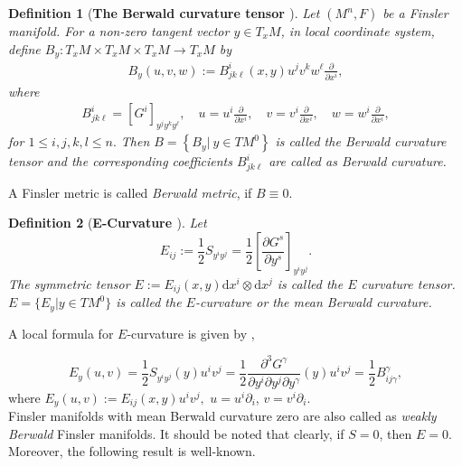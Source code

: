 \documentclass[pdflatex,sn-mathphys-num]{sn-jnl}%
\theoremstyle{thmstyleone}%
\theoremstyle{thmstyletwo}%
\theoremstyle{thmstylethree}%
\newtheorem{definition}{Definition}%
\begin{document}
 \vspace{0.15in}	
 
	\begin{definition}[\textbf{The Berwald curvature tensor \cite[\boldmath p. $127$]{FMSBC}}]\label{Ber}
		Let $(M^n,F)$ be a Finsler manifold.  For a non-zero tangent vector $y\in T_xM$, in local coordinate system, define $B_y:T_xM \times T_xM \times T_xM \rightarrow T_xM$  by
			\begin{align}
				B_y(u,v,w):=B^i_{jk{\ell}}(x,y)u^jv^kw^{\ell}\frac{\partial}{\partial x^i},
			\end{align}
   where       
   \begin{align}
				B^i_{jk{\ell}}=[G^i]_{y^jy^k y^{\ell}},\quad  u=u^i\frac{\partial}{\partial x^i},\quad v=v^i\frac{\partial}{\partial x^i}, \quad w=w^i\frac{\partial}{\partial x^i},
			\end{align}
                for $1\leq i,j,k,l\leq n.$  Then 
			$B=\left\lbrace B_y|\ y\in TM^0  \right\rbrace  
			$ is called the 
   {\it Berwald curvature tensor} and the corresponding 
   coefficients $B^i_{jk{\ell}}$ are called as
{\it Berwald curvature}. 
   
	\end{definition}

A Finsler metric is called {\it Berwald metric}, if 
   $B \equiv 0.$

\vspace{0.15in}	

\begin{definition}[\textbf{E-Curvature \cite[\boldmath p. $118$]{SSZ}}]
     Let $$E_{ij} :=\frac{1}{2}S_{y^iy^j}=\frac{1}{2}\left[\frac{\partial G^s}{\partial y^s}\right]_{y^iy^j}.$$
     The symmetric tensor $E:=E_{ij}(x,y)\mathrm{d}x^i\otimes \mathrm{d}x^j $ is called the $E$ curvature tensor. $E=\{E_y|y\in TM^0\}$ is called the $E$-curvature or the mean Berwald curvature.
\end{definition}

A local formula for $E$-curvature is given by \cite{SSZ},

$$E_y(u,v)=\frac{1}{2}S_{y^iy^j}(y)u^iv^j=\frac{1}{2}\frac{\partial^3G^\gamma}{\partial y^i \partial y^j \partial y^\gamma}(y)u^iv^j=\frac{1}{2}B^{\gamma}_{ij\gamma},$$
 where $E_y(u,v):=E_{ij}(x,y)u^iv^j, $ $u=u^i\partial_i$, $v=v^i\partial_i$. \\

Finsler manifolds with mean Berwald curvature zero are
also called as {\it weakly Berwald} Finsler manifolds.
It should be noted that clearly, if $S =0$, then $E = 0$.
Moreover, the following result is well-known.
\end{document}
